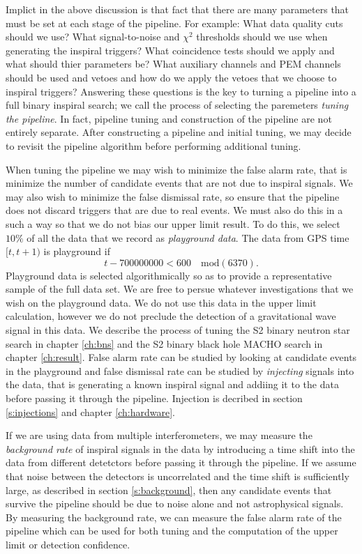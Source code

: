 Implict in the above discussion is that fact that there are many parameters
that must be set at each stage of the pipeline. For example: What data quality
cuts should we use? What signal-to-noise and $\chi^2$ thresholds should we use
when generating the inspiral triggers? What coincidence tests should we apply
and what should thier parameters be? What auxiliary channels and PEM channels
should be used and vetoes and how do we apply the vetoes that we choose to
inspiral triggers? Answering these questions is the key to turning a pipeline
into a full binary inspiral search; we call the process of selecting the
paremeters \emph{tuning the pipeline}. In fact, pipeline tuning and
construction of the pipeline are not entirely separate. After constructing a
pipeline and initial tuning, we may decide to revisit the pipeline algorithm
before performing additional tuning.

When tuning the pipeline we may wish to minimize the false alarm rate, that is
minimize the number of candidate events that are not due to inspiral signals.
We may also wish to minimize the false dismissal rate, so ensure that the
pipeline does not discard triggers that are due to real events. We must also
do this in a such a way so that we do not bias our upper limit result. To do
this, we select $10\%$ of all the data that we record as \emph{playground
data}. The data from GPS time $[t,t+1)$ is playground if 
\begin{equation}
t - 700000000  < 600 \quad \mathrm{mod}(6370).
\end{equation}
Playground data is selected algorithmically so as to provide a representative
sample of the full data set. We are free to persue whatever investigations
that we wish on the playground data. We do not use this data in the upper
limit calculation, however we do not preclude the detection of a gravitational
wave signal in this data. We describe the process of tuning the S2 binary
neutron star search in chapter \ref{ch:bns} and the S2 binary black hole MACHO
search in chapter \ref{ch:result}. False alarm rate can be studied by looking
at candidate events in the playground and false dismissal rate can be studied
by \emph{injecting} signals into the data, that is generating a known inspiral
signal and addiing it to the data before passing it through the pipeline.
Injection is decribed in section \ref{s:injections} and chapter
\ref{ch:hardware}.

If we are using data from multiple interferometers, we may measure the
\emph{background rate} of inspiral signals in the data by introducing a time
shift into the data from different detetctors before passing it through the
pipeline. If we assume that noise between the detectors is uncorrelated and
the time shift is sufficiently large, as described in section
\ref{s:background}, then any candidate events that survive the pipeline should
be due to noise alone and not astrophysical signals. By measuring the
background rate, we can measure the false alarm rate of the pipeline which can
be used for both tuning and the computation of the upper limit or detection
confidence.

